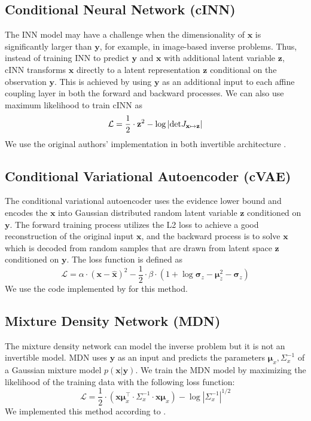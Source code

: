 \documentclass[letterpaper]{article} %
\begin{document}
\subsection{Conditional Neural Network (cINN)}
The INN model may have a challenge when the dimensionality of $\mathbf{x}$ is significantly larger than $\mathbf{y}$, for example, in image-based inverse problems. Thus, instead of training INN to predict $\mathbf{y}$ and $\mathbf{x}$ with additional latent variable $\mathbf{z}$, cINN transforms $\mathbf{x}$ directly to a latent representation $\mathbf{z}$ conditional on the observation $\mathbf{y}$. This is achieved by using $\mathbf{y}$ as an additional input to each affine coupling layer in both the forward and backward processes. We can also use maximum likelihood to train cINN as 
\begin{equation}
    \mathcal{L} = \frac{1}{2} \cdot \mathbf{z}^2 - \log \left|\textup{det} J_{\mathbf{x} \mapsto \mathbf{z}} \right|
\end{equation}
We use the original authors' implementation in both invertible architecture \cite{kruse2021benchmarking}. 

\subsection{Conditional Variational Autoencoder (cVAE)}
The conditional variational autoencoder uses the evidence lower bound and encodes the $\mathbf{x}$ into Gaussian distributed random latent variable $\mathbf{z}$ conditioned on $\mathbf{y}$. The forward training process utilizes the L2 loss to achieve a good reconstruction of the original input $\mathbf{x}$, and the backward process is to solve $\mathbf{x}$ which is decoded from random samples that are drawn from latent space $\mathbf{z}$ conditioned on $\mathbf{y}$. The loss function is defined as 
\begin{equation}
    \mathcal{L} = \alpha \cdot (\mathbf{x}-\hat{\mathbf{x}})^2 - \frac{1}{2} \cdot \beta \cdot (1+\log \mathbf{\sigma}_{z} - \mathbf{\mu}_z^2 -\mathbf{\sigma}_z)
\end{equation}
We use the code implemented by \cite{ma2019probabilistic} for this method. 

\subsection{Mixture Density Network (MDN)}
The mixture density network can model the inverse problem but it is not an invertible model. MDN uses $\mathbf{y}$ as an input and predicts the parameters $\mathbf{\mu}_x, \Sigma_x^{-1}$ of a Gaussian mixture model $p(\mathbf{x}|\mathbf{y})$. We train the MDN model by maximizing the likelihood of the training data with the following loss function:
\begin{equation}
    \mathcal{L} = \frac{1}{2} \cdot \left( \mathbf{x} \mathbf{\mu}_x^{\top} \cdot \Sigma_x^{-1} \cdot \mathbf{x} \mathbf{\mu}_x \right) - \log |\Sigma_x^{-1}|^{1/2}
\end{equation}
We implemented this method according to \cite{bishop2006pattern}.
\end{document}
